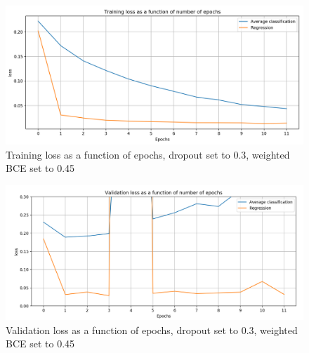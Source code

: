 \begin{figure}[H]
    \centering
        \includegraphics[width=\textwidth]{pictures/regclasstraining.png}
        \caption{Training loss as a function of epochs, dropout set to 0.3, weighted BCE set to 0.45}
        \label{fig:trainingloss}
\end{figure}

\begin{figure}[H]
    \centering
        \includegraphics[width=\textwidth]{pictures/regclassvalidation.png}
        \caption{Validation loss as a function of epochs, dropout set to 0.3, weighted BCE set to 0.45}
        \label{fig:valloss}
\end{figure}
